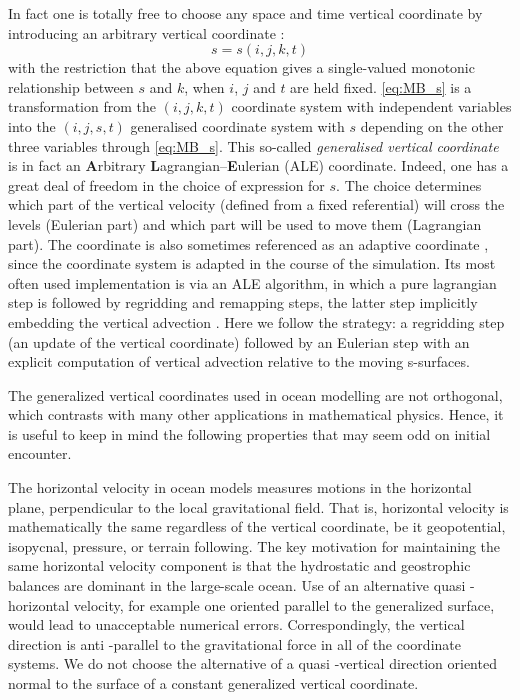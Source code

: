 \documentclass[../main/NEMO_manual]{subfiles}
\begin{document}
In fact one is totally free to choose any space and time vertical coordinate by
introducing an arbitrary vertical coordinate :
\begin{equation}
  \label{eq:MB_s}
  s = s(i,j,k,t)
\end{equation}
with the restriction that the above equation gives a single-valued monotonic relationship between
$s$ and $k$, when $i$, $j$ and $t$ are held fixed.
\autoref{eq:MB_s} is a transformation from
the $(i,j,k,t)$ coordinate system with independent variables into
the $(i,j,s,t)$ generalised coordinate system with $s$ depending on the other three variables through
\autoref{eq:MB_s}.
This so-called \textit{generalised vertical coordinate} \citep{kasahara_MWR74} is in fact
an \textbf{A}rbitrary \textbf{L}agrangian--\textbf{E}ulerian (ALE) coordinate.
Indeed, one has a great deal of freedom in the choice of expression for $s$.
The choice determines which part of the vertical velocity (defined from a fixed referential)
will cross the levels (Eulerian part) and which part will be used to move them (Lagrangian part).
The coordinate is also sometimes referenced as an adaptive coordinate
\citep{hofmeister.burchard.ea_OM10}, since the coordinate system is adapted in
the course of the simulation.
Its most often used implementation is via an ALE algorithm,
in which a pure lagrangian step is followed by regridding and remapping steps,
the latter step implicitly embedding the vertical advection
\citep{hirt.amsden.ea_JCP74, chassignet.smith.ea_JPO03, white.adcroft.ea_JCP09}.
Here we follow the \citep{kasahara_MWR74} strategy:
a regridding step (an update of the vertical coordinate) followed by an Eulerian step with
an explicit computation of vertical advection relative to the moving s-surfaces.

The generalized vertical coordinates used in ocean modelling are not orthogonal,
which contrasts with many other applications in mathematical physics.
Hence, it is useful to keep in mind the following properties that may seem odd on initial encounter.

The horizontal velocity in ocean models measures motions in the horizontal plane,
perpendicular to the local gravitational field.
That is, horizontal velocity is mathematically the same regardless of the vertical coordinate,
be it geopotential, isopycnal, pressure, or terrain following.
The key motivation for maintaining the same horizontal velocity component is that
the hydrostatic and geostrophic balances are dominant in the large-scale ocean.
Use of an alternative quasi -horizontal velocity,
for example one oriented parallel to the generalized surface,
would lead to unacceptable numerical errors.
Correspondingly, the vertical direction is anti -parallel to the gravitational force in
all of the coordinate systems.
We do not choose the alternative of a quasi -vertical direction oriented normal to
the surface of a constant generalized vertical coordinate.
\end{document}
